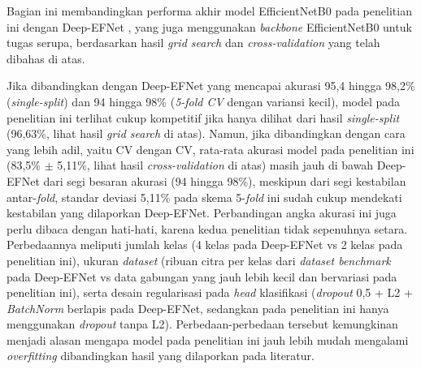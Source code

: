 Bagian ini membandingkan performa akhir model EfficientNetB0 pada penelitian ini dengan Deep-EFNet \cite{alshaari2025deepefnet}, yang juga menggunakan \textit{backbone} EfficientNetB0 untuk tugas serupa, berdasarkan hasil \textit{grid search} dan \textit{cross-validation} yang telah dibahas di atas.

Jika dibandingkan dengan Deep-EFNet \cite{alshaari2025deepefnet} yang mencapai akurasi 95,4 hingga 98,2\% (\textit{single-split}) dan 94 hingga 98\% (\textit{5-fold CV} dengan variansi kecil), model pada penelitian ini terlihat cukup kompetitif jika hanya dilihat dari hasil \textit{single-split} (96,63\%, lihat hasil \textit{grid search} di atas). Namun, jika dibandingkan dengan cara yang lebih adil, yaitu CV dengan CV, rata-rata akurasi model pada penelitian ini (83,5\% $\pm$ 5,11\%, lihat hasil \textit{cross-validation} di atas) masih jauh di bawah Deep-EFNet dari segi besaran akurasi (94 hingga 98\%), meskipun dari segi kestabilan antar-\textit{fold}, standar deviasi 5,11\% pada skema 5-\textit{fold} ini sudah cukup mendekati kestabilan yang dilaporkan Deep-EFNet. Perbandingan angka akurasi ini juga perlu dibaca dengan hati-hati, karena kedua penelitian tidak sepenuhnya setara. Perbedaannya meliputi jumlah kelas (4 kelas pada Deep-EFNet vs 2 kelas pada penelitian ini), ukuran \textit{dataset} (ribuan citra per kelas dari \textit{dataset benchmark} pada Deep-EFNet vs data gabungan yang jauh lebih kecil dan bervariasi pada penelitian ini), serta desain regularisasi pada \textit{head} klasifikasi (\textit{dropout} 0,5 + L2 + \textit{BatchNorm} berlapis pada Deep-EFNet, sedangkan pada penelitian ini hanya menggunakan \textit{dropout} tanpa L2). Perbedaan-perbedaan tersebut kemungkinan menjadi alasan mengapa model pada penelitian ini jauh lebih mudah mengalami \textit{overfitting} dibandingkan hasil yang dilaporkan pada literatur.

